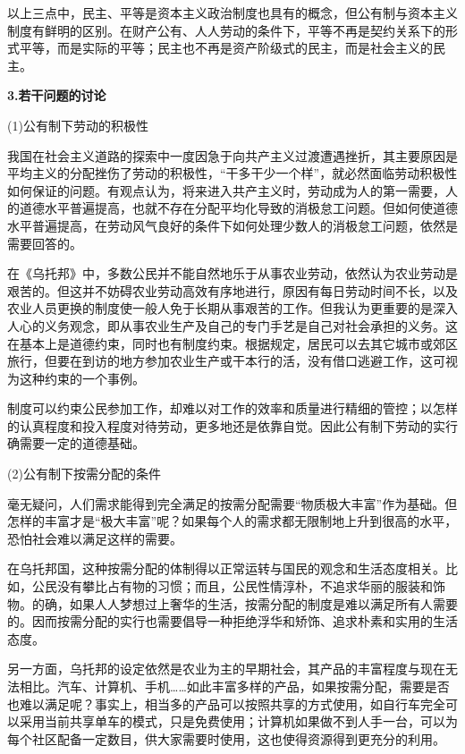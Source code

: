 \par 以上三点中，民主、平等是资本主义政治制度也具有的概念，但公有制与资本主义制度有鲜明的区别。在财产公有、人人劳动的条件下，平等不再是契约关系下的形式平等，而是实际的平等；民主也不再是资产阶级式的民主，而是社会主义的民主。

\par \textbf{3.若干问题的讨论}
\par (1)公有制下劳动的积极性
\par 我国在社会主义道路的探索中一度因急于向共产主义过渡遭遇挫折，其主要原因是平均主义的分配挫伤了劳动的积极性，“干多干少一个样”，就必然面临劳动积极性如何保证的问题。有观点认为，将来进入共产主义时，劳动成为人的第一需要，人的道德水平普遍提高，也就不存在分配平均化导致的消极怠工问题。但如何使道德水平普遍提高，在劳动风气良好的条件下如何处理少数人的消极怠工问题，依然是需要回答的。
\par 在《乌托邦》中，多数公民并不能自然地乐于从事农业劳动，依然认为农业劳动是艰苦的。但这并不妨碍农业劳动高效有序地进行，原因有每日劳动时间不长，以及农业人员更换的制度使一般人免于长期从事艰苦的工作。但我认为更重要的是深入人心的义务观念，即从事农业生产及自己的专门手艺是自己对社会承担的义务。这在基本上是道德约束，同时也有制度约束。根据规定，居民可以去其它城市或郊区旅行，但要在到访的地方参加农业生产或干本行的活，没有借口逃避工作，这可视为这种约束的一个事例。
\par 制度可以约束公民参加工作，却难以对工作的效率和质量进行精细的管控；以怎样的认真程度和投入程度对待劳动，更多地还是依靠自觉。因此公有制下劳动的实行确需要一定的道德基础。
\par (2)公有制下按需分配的条件
\par 毫无疑问，人们需求能得到完全满足的按需分配需要“物质极大丰富”作为基础。但怎样的丰富才是“极大丰富”呢？如果每个人的需求都无限制地上升到很高的水平，恐怕社会难以满足这样的需要。
\par 在乌托邦国，这种按需分配的体制得以正常运转与国民的观念和生活态度相关。比如，公民没有攀比占有物的习惯；而且，公民性情淳朴，不追求华丽的服装和饰物。的确，如果人人梦想过上奢华的生活，按需分配的制度是难以满足所有人需要的。因而按需分配的实行也需要倡导一种拒绝浮华和矫饰、追求朴素和实用的生活态度。
\par 另一方面，乌托邦的设定依然是农业为主的早期社会，其产品的丰富程度与现在无法相比。汽车、计算机、手机……如此丰富多样的产品，如果按需分配，需要是否也难以满足呢？事实上，相当多的产品可以按照共享的方式使用，如自行车完全可以采用当前共享单车的模式，只是免费使用；计算机如果做不到人手一台，可以为每个社区配备一定数目，供大家需要时使用，这也使得资源得到更充分的利用。
